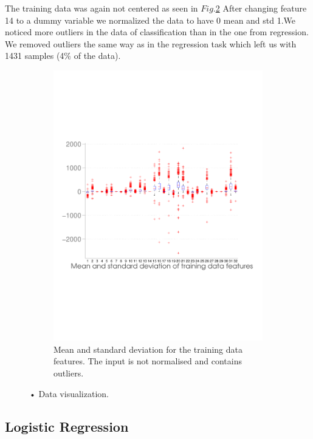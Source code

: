 The training data was again not centered as seen in $Fig.$\ref{fig:dist_classification}
 After changing feature 14 to a dummy variable we normalized the data to have 0 mean and std 1.We noticed more outliers in the data of classification than in the one from regression. We removed outliers the same way as in the regression task which left us with 1431 samples (4$\%$ of the data).
{%
\begin{figure}[h]
  \begin{subfigure}[b]{0.5\textwidth}
   \includegraphics[width=\textwidth]{figures/classification_distribution.pdf}
    \caption{Mean and standard deviation for the training data features. The input is not normalised and contains outliers.}
    \label{fig:dist_classification}
  \end{subfigure}
  \caption{• Data visualization. }
\end{figure}

\subsection{Logistic Regression}

}
